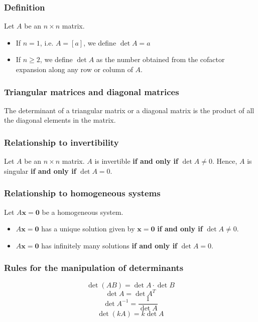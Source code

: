 \documentclass[11pt]{article}
\begin{document}
\subsubsection{Definition}
\label{sec:orgc612725}
Let \(A\) be an \(n \times n\) matrix.
\begin{itemize}
\item If \(n = 1\), i.e. \(A = [a]\), we define \(\det A = a\)
\item If \(n \ge 2\), we define \(\det A\) as the number obtained from the cofactor expansion along any row or column of \(A\).
\end{itemize}

\subsubsection{Triangular matrices and diagonal matrices}
\label{sec:org212f30a}
The determinant of a triangular matrix or a diagonal matrix is the product of all the diagonal elements in the matrix.

\subsubsection{Relationship to invertibility}
\label{sec:orgb3ecfbd}
Let \(A\) be an \(n \times n\) matrix. \(A\) is invertible \textbf{if and only if} \(\det A \ne 0\). Hence, \(A\) is singular \textbf{if and only if} \(\det A = 0\).

\subsubsection{Relationship to homogeneous systems}
\label{sec:orgd7124ae}
Let \(A \boldsymbol{x} = \boldsymbol{0}\) be a homogeneous system.

\begin{itemize}
\item \(A \boldsymbol{x} = \boldsymbol{0}\) has a unique solution given by \(\boldsymbol{x} = \boldsymbol{0}\) \textbf{if and only if} \(\det A \ne 0\).
\item \(A \boldsymbol{x} = \boldsymbol{0}\) has infinitely many solutions \textbf{if and only if} \(\det A = 0\).
\end{itemize}

\subsubsection{Rules for the manipulation of determinants}
\label{sec:org3fcafaf}
\[\det (AB) = \det A \cdot \det B\]
\[\det A = \det A^T\]
\[\det A^{-1} = \frac{1}{\det A}\]
\[\det (kA) = k \det A\]
\end{document}
